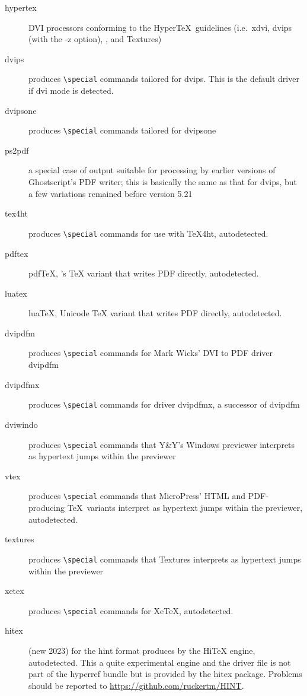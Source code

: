 \documentclass{article}
\newcommand*{\xpackage}[1]{\textsf{#1}}
\begin{document}
\begin{description}
\item[hypertex] DVI processors conforming to the Hyper\TeX\ guidelines (i.e.\ \textsf{xdvi}, \textsf{dvips} (with
the \textsf{-z} option), \textsf{}, and \textsf{Textures})
\item[dvips] produces \verb|\special| commands tailored for \textsf{dvips}. This is the default driver if dvi mode is
detected.
\item[dvipsone] produces \verb|\special| commands tailored for \textsf{dvipsone}
\item[ps2pdf] a special case of output suitable for processing by earlier versions of Ghost\-script's
PDF writer; this is basically the same as that for \textsf{dvips}, but a few variations remained before version 5.21
\item[tex4ht] produces \verb|\special| commands for use with \textsf{\TeX4ht}, autodetected.
\item[pdftex] pdf\TeX, 's \TeX{} variant that writes PDF directly, autodetected.
\item[luatex] lua\TeX, Unicode \TeX{} variant that writes PDF directly, autodetected.
\item[dvipdfm] produces \verb|\special| commands for Mark Wicks' DVI to PDF driver \textsf{dvipdfm}
\item[dvipdfmx] produces \verb|\special| commands for driver
     \textsf{dvipdfmx}, a successor of \textsf{dvipdfm}
\item[dviwindo] produces \verb|\special| commands that Y\&Y's Windows previewer interprets as hypertext jumps within the previewer
\item[vtex] produces \verb|\special| commands that MicroPress' HTML and
     PDF-producing \TeX\ variants interpret as hypertext jumps within the
     previewer, autodetected.
\item[textures] produces \verb|\special| commands that \textsf{Textures} interprets as hypertext jumps within the previewer
\item[xetex] produces \verb|\special| commands for Xe\TeX{}, autodetected.
\item[hitex] (new 2023) for the hint format produces by the Hi\TeX{} engine, autodetected. This a quite experimental
engine and the driver file is not part of the \xpackage{hyperref} bundle but is provided by
the \xpackage{hitex} package. Problems should be reported to \url{https://github.com/ruckertm/HINT}. 
\end{description}
\end{document}
